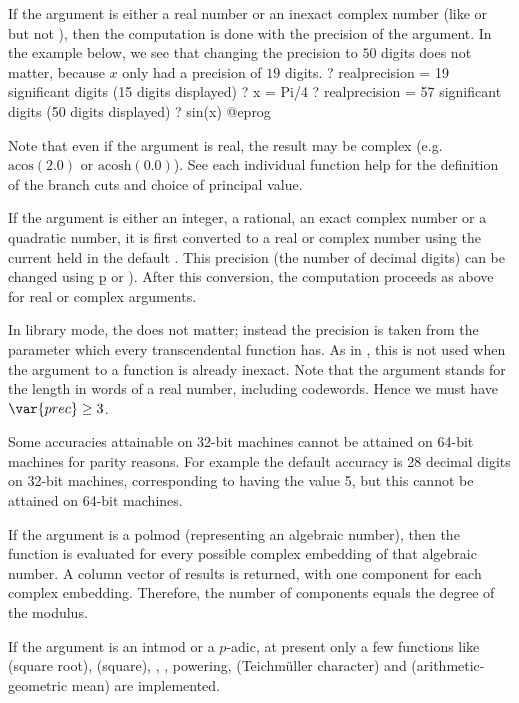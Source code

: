 \item If the argument is either a real number or an inexact complex number
(like  or  but not ), then the
computation is done with the precision of the argument.
In the example below, we see that changing the precision to $50$ digits does
not matter, because $x$ only had a precision of $19$ digits.
\bprog
? 
   realprecision = 19 significant digits (15 digits displayed)
? x = Pi/4
? 
   realprecision = 57 significant digits (50 digits displayed)
? sin(x)
@eprog

Note that even if the argument is real, the result may be complex
(e.g.~$\text{acos}(2.0)$ or $\text{acosh}(0.0)$). See each individual
function help for the definition of the branch cuts and choice of principal
value.

\item If the argument is either an integer, a rational, an exact complex
number or a quadratic number, it is first converted to a real
or complex number using the current  held in the default
.  This precision (the number of decimal digits) can be
changed using \b{p} or ).
After this conversion, the computation proceeds as above for real or complex
arguments.

In library mode, the  does not matter; instead the
precision is taken from the  parameter which every transcendental
function has.  As in , this  is not used when the
argument to a function is already inexact.
Note that the argument  stands for the length in words of a real
number, including codewords. Hence we must have $\var{prec} \geq 3$.

Some accuracies attainable on 32-bit machines cannot be attained
on 64-bit machines for parity reasons. For example the default  accuracy
is 28 decimal digits on 32-bit machines, corresponding to  having
the value 5, but this cannot be attained on 64-bit machines.

\item If the argument is a polmod (representing an algebraic number),
then the function is evaluated for every possible complex embedding of that
algebraic number.  A column vector of results is returned, with one component
for each complex embedding.  Therefore, the number of components equals
the degree of the  modulus.

\item If the argument is an intmod or a $p$-adic, at present only a
few functions like  (square root),  (square), ,
, powering,  (Teichm\"uller character) and
 (arithmetic-geometric mean) are implemented.

